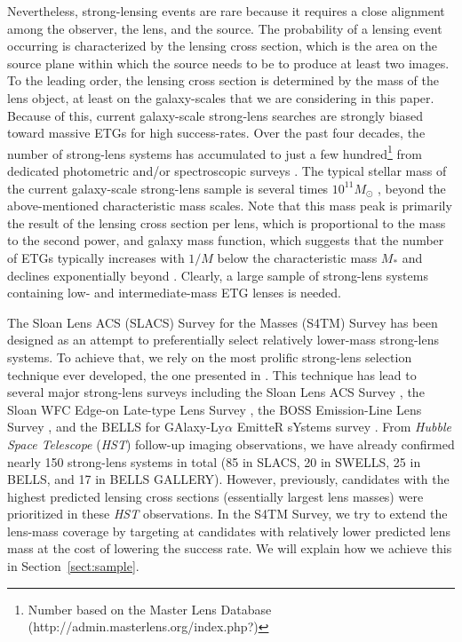 \documentclass{emulateapj}
\begin{document}
Nevertheless, strong-lensing events are rare because it requires a close alignment among 
the observer, the lens, and the source. 
The probability of a lensing event occurring is characterized by the lensing cross section, 
which is the area on the source plane within which the source needs to be to 
produce at least two images. To the leading order, the lensing cross section is determined by 
the mass of the lens object, at least on the galaxy-scales that we are considering in this paper. 
Because of this, current galaxy-scale strong-lens searches are strongly biased toward massive 
ETGs for high success-rates. Over the past four decades, the number of strong-lens systems has 
accumulated to just a few hundred\footnote{Number based on the Master Lens Database 
(http://admin.masterlens.org/index.php?)} from dedicated photometric and/or spectroscopic 
surveys 
\citep[e.g.,][]{Walsh79, Munoz98, Kochanek00, Browne03, Ebeling07, SLACSV, Faure08, SWELLSI, 
Brownstein12, More12, Inada12, Sonnenfeld13, Stark13, Vieira13, Pawase14, More16a, BELLS_IV, 
Negrello17, Sonnenfeld17}. The typical stellar mass of the current galaxy-scale strong-lens 
sample is several times $10^{11} M_{\odot}$ \citep[e.g.,][]{SLACSX, Faure11, Brownstein12, 
Sonnenfeld13}, beyond the above-mentioned characteristic mass scales. 
Note that this mass peak is primarily the result of the lensing cross section per lens, which 
is proportional to the mass to the second power, and galaxy mass function, which suggests that the 
number of ETGs typically increases with $1/M$ below the characteristic mass $M_*$ and declines 
exponentially beyond \citep[e.g.,][]{Li09, Yang09, Ilbert10, Baldry12, Maraston13, Davidzon17}. 
Clearly, a large sample of strong-lens systems containing low- and intermediate-mass 
ETG lenses is needed. 

The Sloan Lens ACS (SLACS) Survey for the Masses (S4TM) Survey has been designed as an 
attempt to preferentially select relatively lower-mass strong-lens systems. 
To achieve that, we rely on the most prolific strong-lens selection technique ever developed, 
the one presented in \citet{Bolton04}. This technique has lead to several major strong-lens 
surveys including the Sloan Lens ACS Survey \citep[SLACS;][]{SLACSV, SLACSIX}, 
the Sloan WFC Edge-on Late-type Lens Survey \citep[SWELLS;][]{SWELLSI, Brewer12}, 
the BOSS Emission-Line Lens Survey \citep[BELLS;][]{Brownstein12}, 
and the BELLS for GAlaxy-Ly$\alpha$ EmitteR sYstems survey \citep[BELLS GALLERY;][]{BELLS_IV}. 
From \textsl{Hubble Space Telescope} (\textsl{HST}) follow-up imaging observations, 
we have already confirmed nearly 150 strong-lens systems in total (85 in SLACS, 20 in SWELLS, 
25 in BELLS, and 17 in BELLS GALLERY). However, previously, candidates with the highest 
 predicted lensing cross sections (essentially largest lens masses) were prioritized in these 
\textsl{HST} observations. In the S4TM Survey, we try to extend the lens-mass 
coverage by targeting at candidates with relatively lower predicted lens mass 
at the cost of lowering the success rate. 
We will explain how we achieve this in Section~\ref{sect:sample}. 
\end{document}
